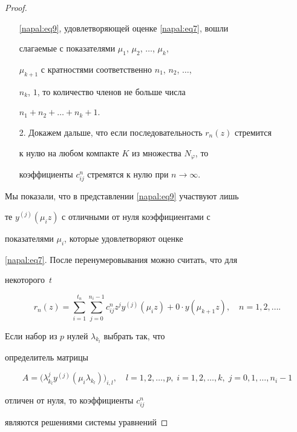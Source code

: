 \begin{proof}
\begin{itemize}
\eqref{napal:eq9}, удовлетворяющей оценке \eqref{napal:eq7}, вошли

слагаемые с показателями $\mu_1$, $\mu_2$, $\ldots$, $\mu_k$,

$\mu_{k+1}$ с кратностями соответственно $n_1$, $n_2$, $\ldots$,

$n_k$, $1$, то количество членов не больше числа

$n_1+n_2+\ldots+n_k+1$.



\item[2.] Докажем дальше, что если последовательность $r_n(z)$ стремится

к нулю на любом компакте $K$ из множества $N_\varphi$, то

коэффициенты $c_{ij}^n$ стремятся к нулю при $n \to \infty$.





\end{itemize}



Мы показали, что в представлении \eqref{napal:eq9} участвуют лишь

те $y^{(j)}(\mu_i z)$ с отличными от нуля коэффициентами с

показателями $\mu_i$, которые удовлетворяют оценке

\eqref{napal:eq7}. После перенумеровывания можно считать, что для

некоторого~$t$

\begin{equation}

\label{napal:eq10} r_n(z)=\sum\limits_{i=1}^{t_n}

\sum\limits_{j=0}^{n_i-1} c_{ij}^n z^j y^{(j)}(\mu_i z) + 0 \cdot

y(\mu_{k+1} z), \quad n=1, 2, \ldots .

\end{equation}



Если набор из $p$ нулей $\lambda_{k_l}$ выбрать так, что

определитель матрицы 

$$A= \bigl(\lambda_{k_l}^j y^{(j)}(\mu_i

\lambda_{k_l})\bigr)_{i,l},\quad  l = 1, 2, \ldots, p, \; i= 1, 2, \ldots, k, \; j = 0, 1, \dots, n_i - 1

$$ 

отличен от нуля, то коэффициенты $ c_{ij}^n$

являются решениями системы уравнений


\end{proof}
